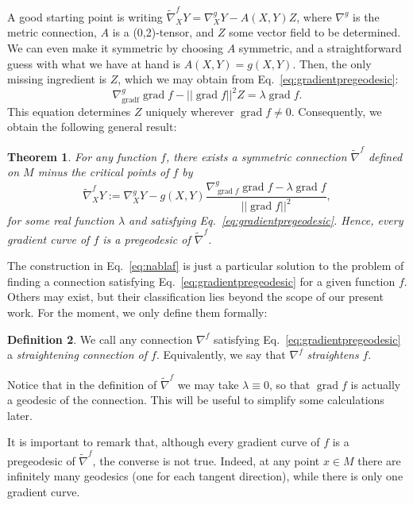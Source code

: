 \documentclass{amsart}
\newtheorem{theorem}{Theorem}[section]
\theoremstyle{definition}
\newtheorem{definition}[theorem]{Definition}
\begin{document}
A good starting point is writing $\tilde\nabla^f_XY=\nabla^g_XY-A(X,Y)Z$, where $\nabla^g$ is the metric connection, 
$A$ is a (0,2)-tensor, and $Z$ some vector field to be determined. 
We can even make it symmetric by choosing $A$ symmetric, 
and a straightforward guess with what we have at hand is $A(X,Y)=g(X,Y)$. Then, the only missing ingredient is $Z$, which we may obtain from  
Eq.~\eqref{eq:gradientpregeodesic}:
\begin{equation}\label{eq:Z}
    \nabla^g_{\operatorname{grad f}}\operatorname{grad} f-||\operatorname{grad }f||^2Z=\lambda\operatorname{grad }f.
\end{equation}
This equation determines $Z$ uniquely wherever $\operatorname{grad}f \neq 0$. Consequently, we obtain the following general result:

\begin{theorem}\label{thm:main}
    For any function $f$, there exists a symmetric connection $\tilde\nabla^f$ defined on $M$ minus the critical points of $f$ by
    \begin{equation}\label{eq:nablaf}
        \tilde\nabla^f_XY:=\nabla^g_XY- 
        g(X,Y)\frac{\nabla^g_{\operatorname{grad}f}\operatorname{grad}f-\lambda\operatorname{grad }f}{||\operatorname{grad }f||^2},
    \end{equation}
    for some real function $\lambda$ and satisfying Eq.~\eqref{eq:gradientpregeodesic}. 
    Hence, every gradient curve of $f$ is a pregeodesic of $\tilde\nabla^f$.
\end{theorem}

The construction in Eq.~\eqref{eq:nablaf} is just a particular solution to the problem of finding a connection satisfying Eq.~\eqref{eq:gradientpregeodesic} for a given function $f$. Others may exist, but their classification lies beyond the scope of our present work. For the moment, we only define them formally:

    \begin{definition}
        We call any connection $\nabla^f$ satisfying
        Eq.~\eqref{eq:gradientpregeodesic} a \emph{straightening connection of $f$}.
        Equivalently, we say that $\nabla^f$ \emph{straightens} $f$.
    \end{definition}

Notice that in the definition of $\tilde\nabla^f$ we may take $\lambda\equiv0$, 
so that $\operatorname{grad}f$ is actually a geodesic of the connection. 
This will be useful to simplify some calculations later. 

It is important to remark that, although every gradient curve of $f$ is a pregeodesic of $\tilde \nabla^f$, the converse is not true.
Indeed, at any point $x\in M$ there are infinitely many geodesics (one for each tangent direction), 
while there is only one gradient curve.
\end{document}
